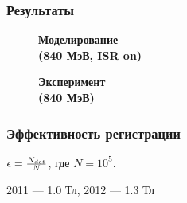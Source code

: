 \documentclass[14pt, hyperref = {colorlinks}]{beamer}
\begin{document}
\begin{frame}\label{r2}
\frametitle{Результаты}
\begin{figure}[h]
  \begin{minipage}[h]{0.49\linewidth}
    \center\textbf{Моделирование \\(840 МэВ, ISR on)}
  \end{minipage}
  \hfill
  \begin{minipage}[h]{0.49\linewidth}
    \center\textbf{Эксперимент \\(840 МэВ)}
  \end{minipage}
\end{figure}
\end{frame}

\begin{frame}
\frametitle{Эффективность регистрации}
\center $\epsilon = {N_{det}\over{N}}$, где $N=10^{5}$.

2011 --- 1.0 Тл, 2012 --- 1.3 Тл
\begin{figure}[h]
\end{figure}
\end{frame}
\end{document}
